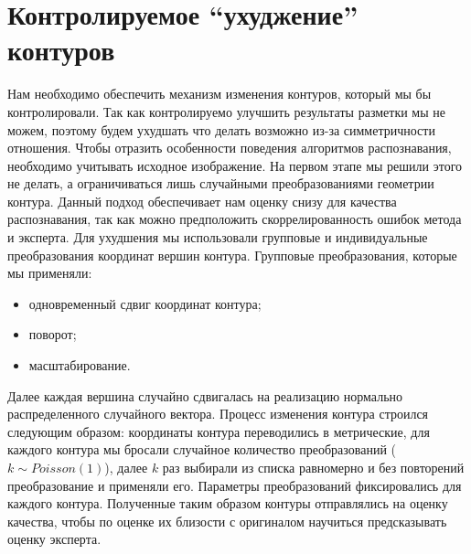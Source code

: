\documentclass[12pt]{article}
\begin{document}
\section{Контролируемое ``ухуджение'' контуров}
\label{morphing}
Нам необходимо обеспечить механизм изменения контуров, который мы бы контролировали. Так как контролируемо улучшить результаты разметки мы не можем, поэтому будем ухудшать что делать возможно из-за симметричности отношения. Чтобы отразить особенности поведения алгоритмов распознавания, необходимо учитывать исходное изображение. На первом этапе мы решили этого не делать, а ограничиваться лишь случайными преобразованиями геометрии контура. Данный подход обеспечивает нам оценку снизу для качества распознавания, так как можно предположить скоррелированность ошибок метода и эксперта. Для ухудшения мы использовали групповые и индивидуальные преобразования координат вершин контура. Групповые преобразования, которые мы применяли:
\begin{itemize}
	\item одновременный сдвиг координат контура;
	\item поворот;
	\item масштабирование.
\end{itemize}
Далее каждая вершина случайно сдвигалась на реализацию нормально распределенного случайного вектора. Процесс изменения контура строился следующим образом: координаты контура переводились в метрические, для каждого контура мы бросали случайное количество преобразований ($k \sim Poisson(1)$), далее $k$ раз выбирали из списка равномерно и без повторений преобразование и применяли его. Параметры преобразований фиксировались для каждого контура. Полученные таким образом контуры отправлялись на оценку качества, чтобы по оценке их близости с оригиналом научиться предсказывать оценку эксперта.
\end{document}
